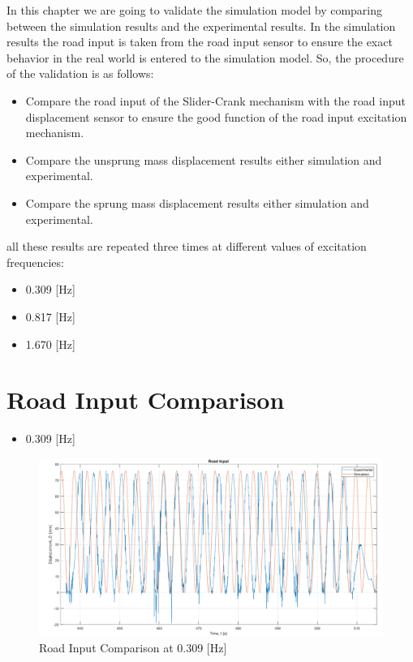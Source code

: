 In this chapter we are going to validate the simulation model by comparing between the simulation results and the experimental results.
\newline
In the simulation results the road input is taken from the road input sensor to ensure the exact behavior in the real world is entered to the simulation model. So, the procedure of the validation is as follows:
\begin{itemize}
	\item Compare the road input of the Slider-Crank mechanism with the road input displacement sensor to ensure the good function of the road input excitation mechanism.
	\item Compare the unsprung mass displacement results either simulation and experimental.
	\item Compare the sprung mass displacement results either simulation and experimental.
\end{itemize}
all these results are repeated three times at different values of excitation frequencies:
\begin{itemize}
	\item 0.309 [Hz]
	\item 0.817 [Hz]
	\item 1.670 [Hz]
\end{itemize}

\section{Road Input Comparison}
\begin{itemize}
	\item 0.309 [Hz]
\end{itemize}
\begin{figure}[H]
	\centering
	\includegraphics[width=0.9\linewidth]{figures/0.309 RI.png}
	\caption{Road Input Comparison at 0.309 [Hz]}
	\label{fig:Road Input Comparison at 0.309}
\end{figure}


